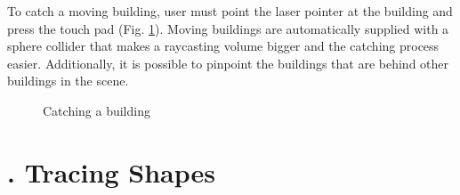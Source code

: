 \begin{appendices}
To catch a moving building, user must point the laser pointer at the building and press the touch pad (Fig. \ref{fig:finalstudycatchingbuilding1}). Moving buildings are automatically supplied with a sphere collider that makes a raycasting volume bigger and the catching process easier. Additionally, it is possible to pinpoint the buildings that are behind other buildings in the scene.

\begin{figure}
	\centering
	
	\par
	
	\caption{Catching a building}
	\label{fig:finalstudycatchingbuilding1}
\end{figure}


\chapter{. Tracing Shapes}
\label{app:finalstudy_tracingshapes}

\begin{figure}
	\centering
	

\end{figure}
\end{appendices}
